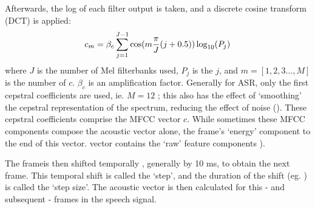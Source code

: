 Afterwards, the log of each filter output is taken, and a discrete cosine transform (DCT) is applied: \begin{equation} \label{eq:mfcc-calculation}  c_m = \beta_c \sum_{j=1}^{J-1} \cos(m\dfrac{\pi}{J} (j+0.5)) \log_{10} (P_j) \end{equation} where $J$ is the number of Mel filterbanks used, $P_j$ is the \DIFdelbegin {}\DIFdelend \DIFaddbegin {}\DIFaddend $j$\DIFdelbegin {}\DIFdelend , and $m=[1,2,3...,M]$ is the number of \DIFdelbegin {}\DIFdelend \DIFaddbegin {}\DIFaddend $c$.  $\beta_c$ is an amplification factor.  Generally for ASR, only the first \DIFdelbegin {}\DIFdelend \DIFaddbegin {}\DIFaddend cepstral coefficients are used, ie. $M=12$ \DIFaddbegin {}\DIFaddend ; this also has the effect of `smoothing' the cepstral representation of the spectrum, reducing the effect of noise (\cite{gold:11}).  These \DIFdelbegin {}\DIFdelend \DIFaddbegin {}\DIFaddend cepstral coefficients comprise the MFCC vector $c$.  While sometimes these \DIFdelbegin {}\DIFdelend \DIFaddbegin {}\DIFaddend MFCC components compose the acoustic vector alone,  \DIFdelbegin {}\DIFdelend the frame's `energy' component \DIFaddbegin {}\DIFaddend to the end of this vector.  \DIFdelbegin {}\DIFdelend \DIFaddbegin {}\DIFaddend vector contains the \DIFdelbegin {}\DIFdelend \DIFaddbegin {}\DIFaddend `raw' feature components \DIFdelbegin {}\DIFdelend \DIFaddbegin {}\DIFaddend ).  

The frame\DIFaddbegin {}\DIFaddend is then shifted temporally \DIFaddbegin {}\DIFaddend , generally by 10 ms, to obtain the next frame. This temporal shift is called the `step', and the duration of the shift (eg. \DIFdelbegin {}\DIFdelend \DIFaddbegin {}\DIFaddend ) is called the `step size'.  The acoustic vector is then calculated for this - and subsequent - frames in the speech signal.

